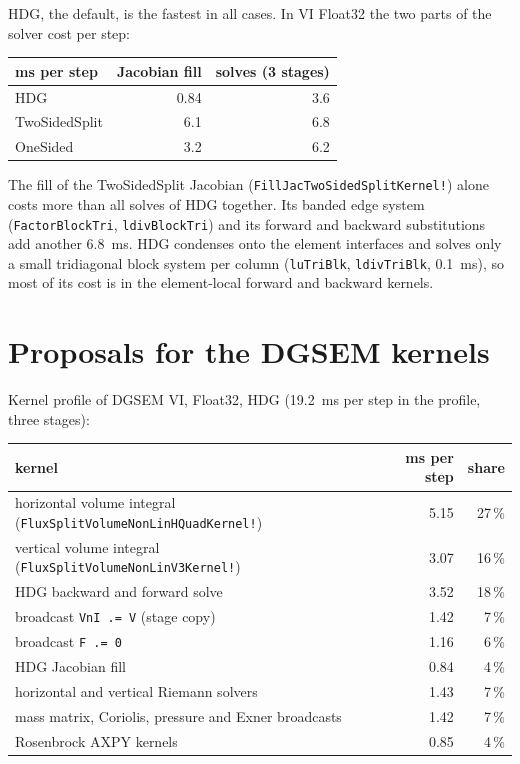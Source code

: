 \documentclass[11pt,a4paper]{article}
\newcommand{\code}[1]{\texttt{#1}}
\begin{document}
HDG, the default, is the fastest in all cases. In VI Float32 the two
parts of the solver cost per step:

\begin{center}
\small
\begin{tabular}{lrr}
\toprule
ms per step & Jacobian fill & solves (3 stages) \\
\midrule
HDG           & 0.84 & 3.6 \\
TwoSidedSplit & 6.1  & 6.8 \\
OneSided      & 3.2  & 6.2 \\
\bottomrule
\end{tabular}
\end{center}

The fill of the TwoSidedSplit Jacobian (\code{FillJacTwoSidedSplitKernel!})
alone costs more than all solves of HDG together. Its banded edge system
(\code{FactorBlockTri}, \code{ldivBlockTri}) and its forward and backward
substitutions add another 6.8~ms. HDG condenses onto the element interfaces
and solves only a small tridiagonal block system per column
(\code{luTriBlk}, \code{ldivTriBlk}, 0.1~ms), so most of its cost is in
the element-local forward and backward kernels.

\section{Proposals for the DGSEM kernels}

Kernel profile of DGSEM VI, Float32, HDG (19.2~ms per step in the profile,
three stages):

\begin{center}
\small
\begin{tabular}{lrr}
\toprule
kernel & ms per step & share \\
\midrule
horizontal volume integral (\code{FluxSplitVolumeNonLinHQuadKernel!}) & 5.15 & 27\,\% \\
vertical volume integral (\code{FluxSplitVolumeNonLinV3Kernel!})      & 3.07 & 16\,\% \\
HDG backward and forward solve                                      & 3.52 & 18\,\% \\
broadcast \code{VnI .= V} (stage copy)                               & 1.42 & 7\,\% \\
broadcast \code{F .= 0}                                              & 1.16 & 6\,\% \\
HDG Jacobian fill                                                    & 0.84 & 4\,\% \\
horizontal and vertical Riemann solvers                              & 1.43 & 7\,\% \\
mass matrix, Coriolis, pressure and Exner broadcasts                 & 1.42 & 7\,\% \\
Rosenbrock AXPY kernels                                              & 0.85 & 4\,\% \\
\bottomrule
\end{tabular}
\end{center}
\end{document}
